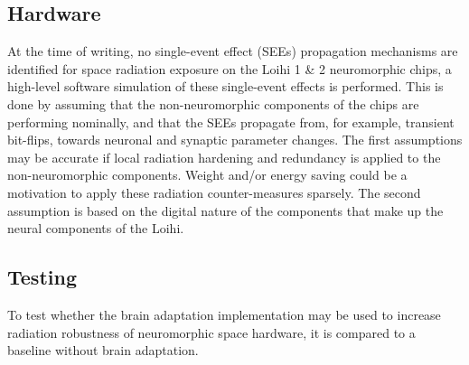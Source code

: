 \subsection*{Hardware}\label{subsec:hardware}
At the time of writing, no single-event effect (SEEs) propagation mechanisms are identified for space radiation exposure on the Loihi 1 \& 2  neuromorphic chips, a high-level software simulation of these single-event effects is performed. This is done by assuming that the non-neuromorphic components of the chips are performing nominally, and that the SEEs propagate from, for example, transient bit-flips, towards neuronal and synaptic parameter changes. The first assumptions may be accurate if local radiation hardening and redundancy is applied to the non-neuromorphic components. Weight and/or energy saving could be a motivation to apply these radiation counter-measures sparsely. The second assumption is based on the digital nature of the components that make up the neural components of the Loihi. %




\subsection*{Testing}\label{subsec:testing}
To test whether the brain adaptation implementation may be used to increase radiation robustness of neuromorphic space hardware, it is compared to a baseline without brain adaptation. 

